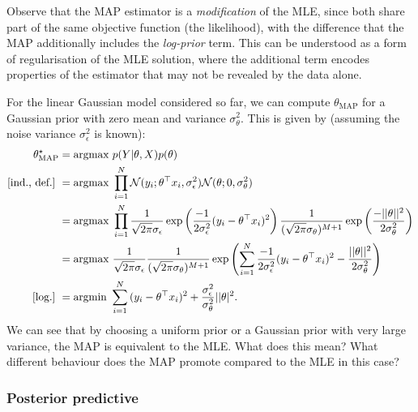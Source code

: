 \begin{remark}
Observe that the MAP estimator is a \emph{modification} of the MLE, since both share part of the same objective function (the likelihood), with the difference that the MAP additionally includes the \emph{log-prior} term. This can be understood as a form of regularisation of the MLE solution, where the additional term encodes properties of the estimator that may not be revealed by the data alone.
\end{remark}

\begin{example}
For the linear Gaussian model considered so far, we can compute $\theta_{\mathrm{MAP}}$ for a Gaussian prior with zero mean and variance $\sigma_\theta^2$. This is given by (assuming the noise variance $\sigma_\epsilon^2$ is known):
\begin{align}
	\theta_\text{MAP}^\star 	&= \text{argmax } p(Y|\theta,X)p(\theta)\nonumber\\
	\text{[ind., def.]}\ &= \text{argmax } \prod_{i=1}^N {\mathcal N}(y_i;\theta^\top x_i,\sigma_\epsilon^2){\mathcal N}(\theta;0,\sigma_\theta^2) \nonumber\\
	&= \text{argmax } \prod_{i=1}^N \frac{1}{\sqrt{2\pi}\sigma_\epsilon} \exp\left({\frac{-1}{2\sigma_\epsilon^2}(y_i-\theta^\top x_i)^2}\right)											\frac{1}{(\sqrt{2\pi}\sigma_\theta)^{M+1}} \exp\left({\frac{-||\theta||^2}{2\sigma_\theta^2}}\right) \nonumber\\
	 &= \text{argmax } \frac{1}{\sqrt{2\pi}\sigma_\epsilon} \frac{1}{(\sqrt{2\pi}\sigma_\theta)^{M+1}} \exp\left( \sum_{i=1}^N{\frac{-1}{2\sigma_\epsilon^2}(y_i-\theta^\top x_i)^2} -{\frac{||\theta||^2}{2\sigma_\theta^2}}\right) \nonumber\\
	\text{[log.]}\  &= \text{argmin } \sum_{i=1}^N{(y_i-\theta^\top x_i)^2} +{\frac{\sigma_\epsilon^2}{\sigma_\theta^2}||\theta |^2}.\nonumber 
	\label{eq:MAP_reg_lin}
\end{align}
We can see that by choosing a uniform prior or a Gaussian prior with very large variance, the MAP is equivalent to the MLE. What does this mean? What different behaviour does the MAP promote compared to the MLE in this case?
\end{example}


\subsubsection{Posterior predictive}


